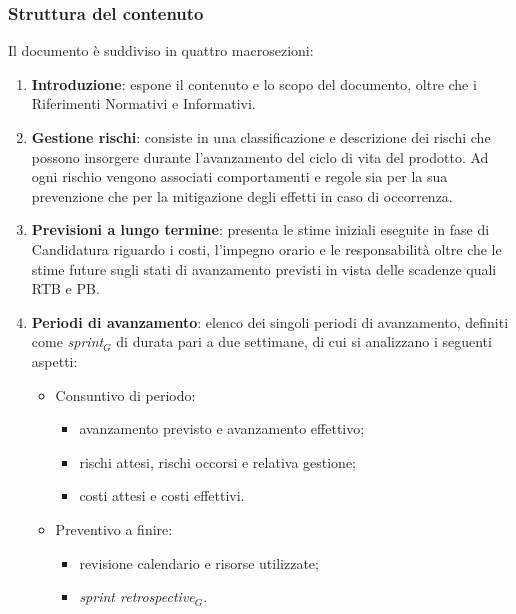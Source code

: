 \documentclass[10pt, letterpaper]{article}
\begin{document}
\subsubsection{Struttura del contenuto}
Il documento è suddiviso in quattro macrosezioni:
\begin{enumerate}
    \item \textbf{Introduzione}: espone il contenuto e lo scopo del documento, oltre che i Riferimenti Normativi e Informativi.
    \item \textbf{Gestione rischi}: consiste in una classificazione e descrizione dei rischi che possono insorgere durante l'avanzamento del ciclo
          di vita del prodotto. Ad ogni rischio vengono associati comportamenti e regole sia per la sua prevenzione che per la mitigazione degli effetti in caso di occorrenza.
    \item \textbf{Previsioni a lungo termine}: presenta le stime iniziali eseguite in fase di Candidatura riguardo i costi, l'impegno orario e le responsabilità oltre che le stime future sugli
          stati di avanzamento previsti in vista delle scadenze quali RTB e PB.
    \item \textbf{Periodi di avanzamento}: elenco dei singoli periodi di avanzamento, definiti come \texorpdfstring{\textit{sprint$_G$}}{sprint} di durata pari a due settimane, di cui si analizzano i seguenti aspetti:
          \begin{itemize}
              \item Consuntivo di periodo:
                    \begin{itemize}
                        \item avanzamento previsto e avanzamento effettivo;
                        \item rischi attesi, rischi occorsi e relativa gestione;
                        \item costi attesi e costi effettivi.
                    \end{itemize}
              \item Preventivo a finire:
                    \begin{itemize}
                        \item revisione calendario e risorse utilizzate;
                        \item \texorpdfstring{\textit{sprint retrospective$_G$}}{sprint retrospective}.
                    \end{itemize}

          \end{itemize}
\end{enumerate}
\end{document}
